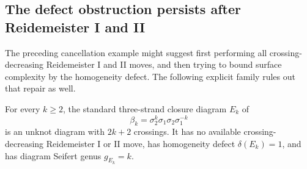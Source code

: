 \subsection{The defect obstruction persists after Reidemeister I and II}
\label{sec:reduced-defect-one}

The preceding cancellation example might suggest first performing all
crossing-decreasing Reidemeister I and II moves, and then trying to bound
surface complexity by the homogeneity defect.  The following explicit
family rules out that repair as well.

\begin{proposition}
For every $k\ge2$, the standard three-strand closure diagram $E_k$ of
\[
 \beta_k=\sigma_2^k\sigma_1\sigma_2\sigma_1^{-k}
\]
is an unknot diagram with $2k+2$ crossings.  It has no available
crossing-decreasing Reidemeister I or II move, has homogeneity defect
$\delta(E_k)=1$, and has diagram Seifert genus $g_{E_k}=k$.
\end{proposition}

